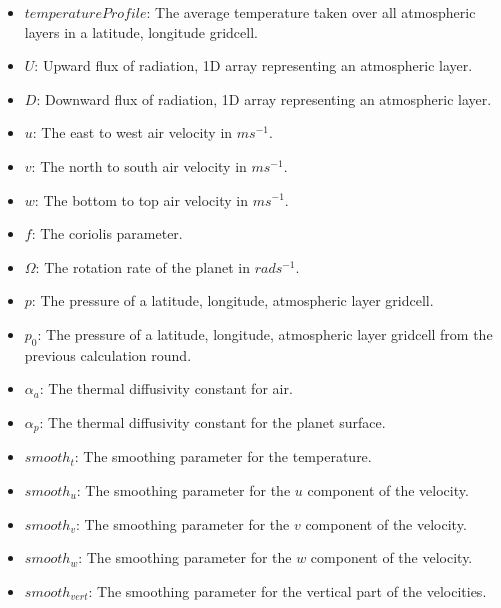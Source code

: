 \begin{itemize}
    \item $temperatureProfile$: The average temperature taken over all atmospheric layers in a latitude, longitude gridcell.
    \item $U$: Upward flux of radiation, 1D array representing an atmospheric layer.
    \item $D$: Downward flux of radiation, 1D array representing an atmospheric layer.
    \item $u$: The east to west air velocity in $ms^{-1}$.
    \item $v$: The north to south air velocity in $ms^{-1}$.
    \item $w$: The bottom to top air velocity in $ms^{-1}$.
    \item $f$: The coriolis parameter.
    \item $\Omega$: The rotation rate of the planet in $rads^{-1}$.
    \item $p$: The pressure of a latitude, longitude, atmospheric layer gridcell.
    \item $p_0$: The pressure of a latitude, longitude, atmospheric layer gridcell from the previous calculation round.
    \item $\alpha_a$: The thermal diffusivity constant for air.
    \item $\alpha_p$: The thermal diffusivity constant for the planet surface.
    \item $smooth_t$: The smoothing parameter for the temperature.
    \item $smooth_u$: The smoothing parameter for the $u$ component of the velocity.
    \item $smooth_v$: The smoothing parameter for the $v$ component of the velocity.
    \item $smooth_w$: The smoothing parameter for the $w$ component of the velocity.
    \item $smooth_{vert}$: The smoothing parameter for the vertical part of the velocities.
\end{itemize}